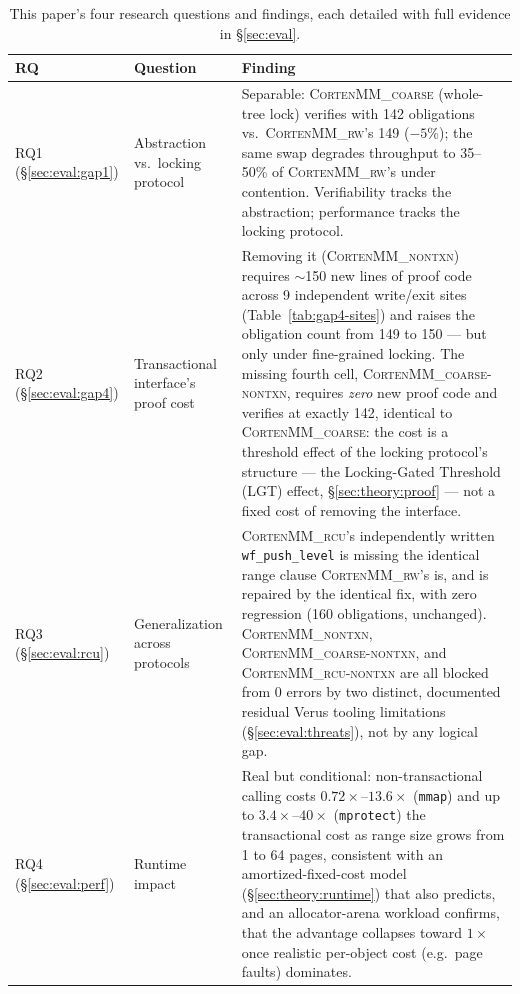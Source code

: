 \documentclass[10pt]{article}
\newcommand{\corten}[1]{\textsc{CortenMM\_#1}}
\newcommand{\vfn}[1]{\texttt{#1}}
\begin{document}
\begin{table}[h]
\centering
\small
\begin{tabularx}{\textwidth}{@{}l >{\raggedright\arraybackslash}p{3.6cm} >{\raggedright\arraybackslash}X@{}}
\toprule
\textbf{RQ} & \textbf{Question} & \textbf{Finding} \\
\midrule
RQ1 (\S\ref{sec:eval:gap1}) &
  Abstraction vs.\ locking protocol &
  Separable: \corten{coarse} (whole-tree lock) verifies with 142
  obligations vs.\ \corten{rw}'s 149 ($-5\%$); the same swap degrades
  throughput to 35--50\% of \corten{rw}'s under contention. Verifiability
  tracks the abstraction; performance tracks the locking protocol. \\
\addlinespace
RQ2 (\S\ref{sec:eval:gap4}) &
  Transactional interface's proof cost &
  Removing it (\corten{nontxn}) requires $\sim$150 new lines of proof
  code across 9 independent write/exit sites
  (Table~\ref{tab:gap4-sites}) and raises the obligation count from
  149 to 150 --- but only under fine-grained locking. The missing
  fourth cell, \corten{coarse-nontxn}, requires \emph{zero} new proof
  code and verifies at exactly 142, identical to \corten{coarse}: the
  cost is a threshold effect of the locking protocol's structure ---
  the Locking-Gated Threshold (LGT) effect,
  \S\ref{sec:theory:proof} --- not a fixed cost of removing the
  interface. \\
\addlinespace
RQ3 (\S\ref{sec:eval:rcu}) &
  Generalization across protocols &
  \corten{rcu}'s independently written \vfn{wf\_push\_level} is missing
  the identical range clause \corten{rw}'s is, and is repaired by the
  identical fix, with zero regression (160 obligations, unchanged).
  \corten{nontxn}, \corten{coarse-nontxn}, and \corten{rcu-nontxn} are all
  blocked from 0 errors by two distinct, documented residual Verus
  tooling limitations (\S\ref{sec:eval:threats}), not by any logical gap. \\
\addlinespace
RQ4 (\S\ref{sec:eval:perf}) &
  Runtime impact &
  Real but conditional: non-transactional calling costs
  $0.72\times$--$13.6\times$ (\vfn{mmap}) and up to $3.4\times$--$40\times$
  (\vfn{mprotect}) the transactional cost as range size grows from 1 to
  64 pages, consistent with an amortized-fixed-cost model
  (\S\ref{sec:theory:runtime}) that also predicts, and an
  allocator-arena workload confirms, that the advantage collapses
  toward $1\times$ once realistic per-object cost (e.g.\ page faults)
  dominates. \\
\bottomrule
\end{tabularx}
\caption{This paper's four research questions and findings, each
detailed with full evidence in \S\ref{sec:eval}.}
\label{tab:intro-summary}
\end{table}
\end{document}
